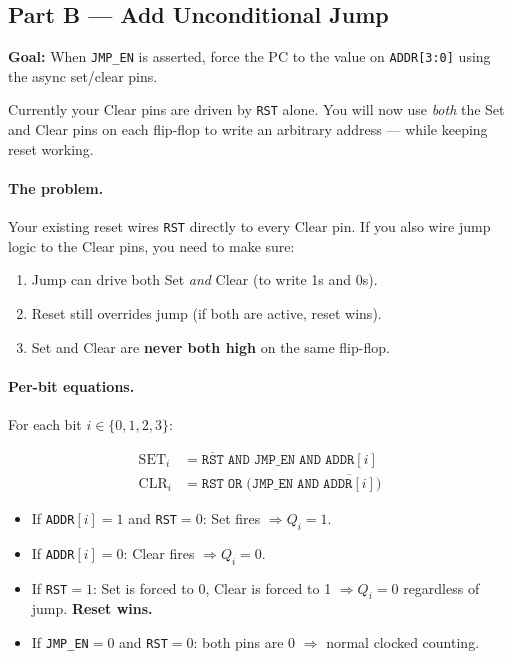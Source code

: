 \documentclass[11pt,a4paper]{article}
\newcommand{\signal}[1]{\texttt{#1}}
\begin{document}
\subsection{Part B --- Add Unconditional Jump}

\textbf{Goal:} When \signal{JMP\_EN} is asserted, force the PC to the value
on \signal{ADDR[3:0]} using the async set/clear pins.

Currently your Clear pins are driven by \signal{RST} alone.
You will now use \emph{both} the Set and Clear pins on each flip-flop
to write an arbitrary address --- while keeping reset working.

\paragraph{The problem.}
Your existing reset wires \signal{RST} directly to every Clear pin.
If you also wire jump logic to the Clear pins, you need to make sure:
\begin{enumerate}[leftmargin=2em]
  \item Jump can drive both Set \emph{and} Clear (to write 1s and 0s).
  \item Reset still overrides jump (if both are active, reset wins).
  \item Set and Clear are \textbf{never both high} on the same flip-flop.
\end{enumerate}

\paragraph{Per-bit equations.} For each bit $i \in \{0,1,2,3\}$:

\begin{align}
  \text{SET}_i  &= \overline{\signal{RST}} \;\texttt{AND}\;
                    \signal{JMP\_EN} \;\texttt{AND}\; \signal{ADDR}[i]
    \label{eq:set} \\[4pt]
  \text{CLR}_i  &= \signal{RST} \;\texttt{OR}\;
                    \bigl(\signal{JMP\_EN} \;\texttt{AND}\;
                    \overline{\signal{ADDR}[i]}\bigr)
    \label{eq:clr}
\end{align}

\begin{itemize}[leftmargin=2em]
  \item If \signal{ADDR}$[i] = 1$ and \signal{RST}$= 0$:
        Set fires $\Rightarrow Q_i = 1$.
  \item If \signal{ADDR}$[i] = 0$:
        Clear fires $\Rightarrow Q_i = 0$.
  \item If \signal{RST}$= 1$: Set is forced to 0, Clear is forced to 1
        $\Rightarrow Q_i = 0$ regardless of jump. \textbf{Reset wins.}
  \item If \signal{JMP\_EN}$= 0$ and \signal{RST}$= 0$:
        both pins are 0 $\Rightarrow$ normal clocked counting.
\end{itemize}
\end{document}
